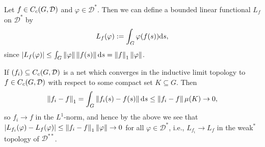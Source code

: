 \begin{definition}
Let $f \in C_c(G,\mathcal{D})$ and $\varphi \in \mathcal{D}^*$. Then we can define a bounded linear functional $L_f$ on $\mathcal{D}^*$ by
\begin{align*}
	L_f(\varphi) := \int_G \varphi(f(s)) \mathrm{d} s,
\end{align*}
since $| L_f(\varphi)| \leq \int_G \left\lVert \varphi \right\rVert \left\lVert f(s) \right\rVert \mathrm{d} s = \left\lVert f \right\rVert_1 \left\lVert \varphi\right\rVert$.
\end{definition}
\begin{note}	
If $(f_i) \subseteq  C_c(G,\mathcal{D})$ is a net which converges in the inductive limit topology to $f \in C_c(G,\mathcal{D})$ with respect to some compact set $K \subseteq G$. Then
\begin{align*}
\left\lVert f_i - f\right\rVert_1 = \int_{G} \left\lVert f_i(s) - f(s) \right\rVert \mathrm{d} s 	\leq \left\lVert f_i - f \right\rVert \mu(K) \to 0,
\end{align*}
so $f_i \to f$ in the $L^1$-norm, and hence by the above we see that $|L_{f_i}(\varphi) - L_f(\varphi) | \leq \left\lVert f_i-f\right\rVert_1 \left\lVert \varphi \right\rVert \to 0$ for all $ \varphi \in \mathcal{D}^*$, i.e.,  $L_{f_i}\to L_f$ in the weak$^*$ topology of $\mathcal{D}^{**}$.
\label{note:induct}
\end{note}

